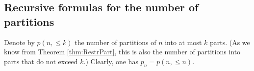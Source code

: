 \subsection{Recursive formulas for the number of partitions}
Denote by $p(n, \le k)$ the number of partitions of $n$ into at most $k$ parts.
(As we know from Theorem \ref{thm:RestrPart}, this is also the number of partitions into parts that do not exceed $k$.)
Clearly, one has $p_n = p(n, \le n)$.

